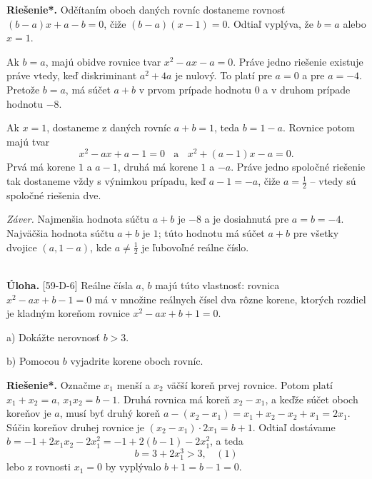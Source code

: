 \documentclass[11pt,a4paper,oneside,final]{book}
\newcommand{\ul}{\textbf{Úloha.} }
\newcommand{\rieh}{\textbf{Riešenie*.} }
\begin{document}
\rieh Odčítaním oboch daných rovníc dostaneme rovnosť $(b-a)x+a-b = 0$, čiže $(b-a)(x-1) = 0$. Odtiaľ vyplýva, že $b = a$ alebo $x = 1$.

Ak $b = a$, majú obidve rovnice tvar $x^2-ax-a = 0$. Práve jedno riešenie existuje práve vtedy, keď diskriminant $a^2 + 4a$ je nulový. To platí pre $a = 0$ a pre $a = -4$. Pretože $b = a$, má súčet $a + b$ v prvom prípade hodnotu $0$ a v druhom prípade hodnotu $-8$.

Ak $x = 1$, dostaneme z daných rovníc $a + b = 1$, teda $b = 1-a$. Rovnice potom majú tvar
$$x^2-ax + a-1 = 0 \ \ \ \ \text{a} \ \ \ \ x^2 + (a-1)x-a = 0.$$
Prvá má korene $1$ a $a-1$, druhá má korene $1$ a $-a$. Práve jedno spoločné riešenie tak dostaneme vždy s výnimkou prípadu, keď $a-1 = -a$, čiže $a = \frac{1}{2}$ -- vtedy sú spoločné riešenia dve.

\textit{Záver.} Najmenšia hodnota súčtu $a + b$ je $-8$ a je dosiahnutá pre $a = b = -4$. Najväčšia hodnota súčtu $a + b$ je $1$; túto hodnotu má súčet $a + b$ pre všetky dvojice $(a, 1-a)$, kde $a\neq \frac{1}{2}$ je ľubovoľné reálne číslo.\\
\\
\begin{tcolorbox}[breakable,notitle,boxrule=0pt,colback=light-gray,colframe=light-gray]\ul[59-D-6] Reálne čísla $a$, $b$ majú túto vlastnosť: rovnica $x^2 -ax+b-1 = 0$ má v množine reálnych čísel dva rôzne korene, ktorých rozdiel je kladným koreňom rovnice $x^2 - ax + b + 1 = 0$.

a) Dokážte nerovnosť $b > 3$.

b) Pomocou $b$ vyjadrite korene oboch rovníc.

\end{tcolorbox}

\rieh  Označme $x_1$ menší a $x_2$ väčší koreň prvej rovnice. Potom platí $x_1 + x_2 = a$, $x_1 x_2 = b - 1$. Druhá rovnica má koreň $x_2 - x_1$, a keďže súčet oboch koreňov je $a$, musí byť druhý koreň $a - (x_2 - x_1 ) = x_1 + x_2 - x_2 + x_1 = 2x_1$. Súčin koreňov druhej rovnice je $(x_2 -x_1 )\cdot2x_1 = b+1$. Odtiaľ dostávame $b = -1+2x_1 x_2 -2x_1^2= -1+2(b-1)-2x_1^2$, a teda
$$b = 3 + 2x_1^3> 3, \ \ \ \  (1)$$
lebo z rovnosti $x_1 = 0$ by vyplývalo $b + 1 = b - 1 = 0$.
\end{document}
